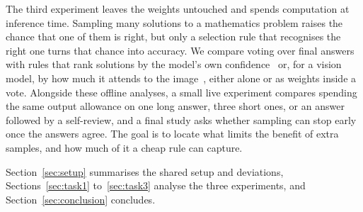 The third experiment leaves the weights untouched and spends computation at inference time. Sampling many solutions to a mathematics problem raises the chance that one of them is right, but only a selection rule that recognises the right one turns that chance into accuracy. We compare voting over final answers with rules that rank solutions by the model's own confidence~\citep{kang2025selfcertainty} or, for a vision model, by how much it attends to the image~\citep{usman2026visconf}, either alone or as weights inside a vote. Alongside these offline analyses, a small live experiment compares spending the same output allowance on one long answer, three short ones, or an answer followed by a self-review, and a final study asks whether sampling can stop early once the answers agree. The goal is to locate what limits the benefit of extra samples, and how much of it a cheap rule can capture.

Section~\ref{sec:setup} summarises the shared setup and deviations, Sections~\ref{sec:task1} to~\ref{sec:task3} analyse the three experiments, and Section~\ref{sec:conclusion} concludes.
